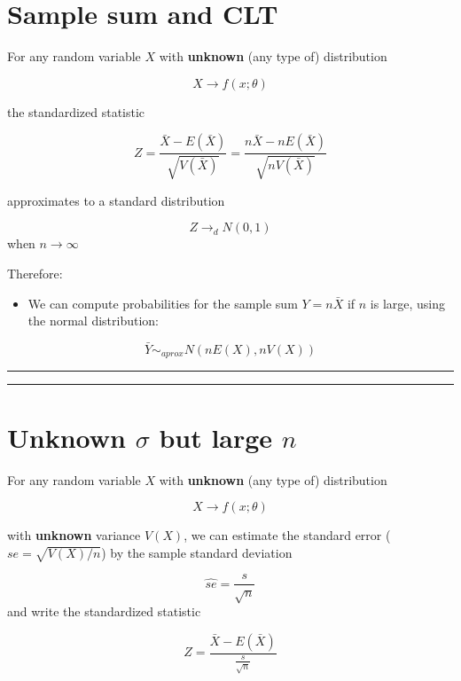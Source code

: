 \documentclass[
]{book}
\providecommand{\tightlist}{%
  \setlength{\itemsep}{0pt}\setlength{\parskip}{0pt}}
\begin{document}
\hypertarget{sample-sum-and-clt}{%
\section{Sample sum and CLT}\label{sample-sum-and-clt}}

For any random variable \(X\) with \textbf{unknown} (any type of) distribution

\[X \rightarrow f(x; \theta)\]

the standardized statistic

\[Z=\frac{\bar{X}-E(\bar{X})}{\sqrt{V(\bar{X})}}=\frac{n\bar{X}-nE(\bar{X})}{\sqrt{nV(\bar{X})}}\]

approximates to a standard distribution

\[Z \rightarrow_d N(0,1)\] when \(n\rightarrow \infty\)

Therefore:

\begin{itemize}
\tightlist
\item
  We can compute probabilities for the sample sum \(Y=n\bar{X}\) if \(n\) is large, using the normal distribution:
\end{itemize}

\[\bar{Y} \sim_{aprox}  N(nE(X), nV(X))\]

\begin{center}\rule{0.5\linewidth}{0.5pt}\end{center}

\begin{center}\rule{0.5\linewidth}{0.5pt}\end{center}

\hypertarget{unknown-sigma-but-large-n}{%
\section{\texorpdfstring{Unknown \(\sigma\) but large \(n\)}{Unknown \textbackslash sigma but large n}}\label{unknown-sigma-but-large-n}}

For any random variable \(X\) with \textbf{unknown} (any type of) distribution

\[X \rightarrow f(x; \theta)\]

with \textbf{unknown} variance \(V(X)\), we can estimate the standard error (\(se=\sqrt{V(X)/n}\)) by the sample standard deviation

\[\hat{se}=\frac{s}{\sqrt{n}}\] and write the standardized statistic

\[Z=\frac{\bar{X}-E(\bar{X})}{\frac{s}{\sqrt{n}}} \]
\end{document}
